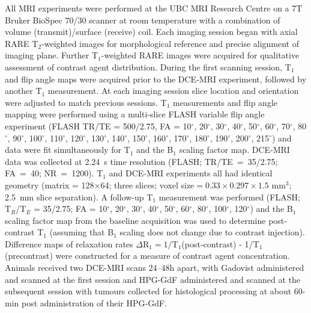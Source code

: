 All MRI experiments were performed at the UBC MRI Research Centre on a 7T Bruker BioSpec 70/30 scanner at room temperature with a combination of volume (transmit)/surface (receive) coil.
Each imaging session began with axial \acs{RARE} T$_2$-weighted images for morphological reference and precise alignment of imaging plane.
Further T$_1$-weighted \acs{RARE} images were acquired for qualitative assessment of contrast agent distribution.
During the first scanning session, T$_1$ and flip angle maps were acquired prior to the \acs{DCE-MRI} experiment, followed by another T$_1$ measurement.
At each imaging session slice location and orientation were adjusted to match previous sessions.
T$_1$ measurements and flip angle mapping were performed using a multi-slice FLASH variable flip angle experiment (FLASH TR/TE = 500/2.75, FA = 10$^{\circ}$, 20$^{\circ}$, 30$^{\circ}$, 40$^{\circ}$, 50$^{\circ}$, 60$^{\circ}$, 70$^{\circ}$, 80$^{\circ}$, 90$^{\circ}$, 100$^{\circ}$, 110$^{\circ}$, 120$^{\circ}$, 130$^{\circ}$, 140$^{\circ}$, 150$^{\circ}$, 160$^{\circ}$, 170$^{\circ}$, 180$^{\circ}$, 190$^{\circ}$, 200$^{\circ}$, 215$^{\circ}$) and data were fit simultaneously for T$_1$ and the B$_1$ scaling factor map.
\acs{DCE-MRI} data was collected at 2.24~s time resolution (FLASH; TR/TE~=~35/2.75; FA~=~40; NR~=~1200).
T$_1$ and \acs{DCE-MRI} experiments all had identical geometry (matrix = 128$\times$64; three slices; voxel size$=0.33\times 0.297\times 1.5$ mm$^3$; 2.5~mm slice separation).
A follow-up T$_1$ measurement was performed (FLASH; T$_R$/T$_E$ = 35/2.75; FA = 10$^{\circ}$, 20$^{\circ}$, 30$^{\circ}$, 40$^{\circ}$, 50$^{\circ}$, 60$^{\circ}$, 80$^{\circ}$, 100$^{\circ}$, 120$^{\circ}$) and the B$_1$ scaling factor map from the baseline acquisition was used to determine post-contrast T$_1$ (assuming that B$_1$ scaling does not change due to contrast injection).
Difference maps of relaxation rates $\Delta$R$_1=1/$T$_1$(post-contrast) - 1/T$_1$(precontrast) were constructed for a measure of contrast agent concentration.
Animals received two \acs{DCE-MRI} scans 24--48h apart, with Gadovist administered and scanned at the first session and \acs{HPG-GdF} administered and scanned at the subsequent session with tumours collected for histological processing at about 60-min post administration of their \acs{HPG-GdF}.

